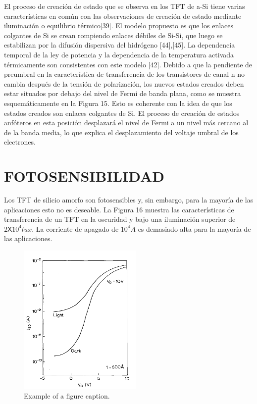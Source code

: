 \documentclass[conference]{IEEEtran}
\begin{document}
    El proceso de creación de estado que se observa en los TFT de a-Si tiene varias características 
    en común con las observaciones de creación de estado mediante iluminación o equilibrio térmico[39]. 
    El modelo propuesto es que los enlaces colgantes de Si se crean rompiendo enlaces débiles de 
    Si-Si, que luego se estabilizan por la difusión dispersiva del hidrógeno [44],[45]. La 
    dependencia temporal de la ley de potencia y la dependencia de la temperatura activada 
    térmicamente son consistentes con este modelo [42]. Debido a que la pendiente de preumbral en la 
    característica de transferencia de los transistores de canal n no cambia después de la tensión 
    de polarización, los nuevos estados creados deben estar situados por debajo del nivel de Fermi de 
    banda plana, como se muestra esquemáticamente en la Figura 15. Esto es coherente con la idea de 
    que los estados creados son enlaces colgantes de Si. El proceso de creación de estados anfóteros 
    en esta posición desplazará el nivel de Fermi a un nivel más cercano al de la banda media, lo que 
    explica el desplazamiento del voltaje umbral de los electrones.

\section{FOTOSENSIBILIDAD}

    Los TFT de silicio amorfo son fotosensibles y, sin embargo, para la mayoría de las aplicaciones 
    esto no es deseable. La Figura 16 muestra las características de transferencia de un TFT en 
    la oscuridad y bajo una iluminación superior de $2 \mathsf{X} 10^{4} lux$. La corriente de apagado de 
    $10^{4} A$ es demasiado alta para la mayoría de las aplicaciones.

\begin{figure}[htbp]
    \centerline{\includegraphics[width=6.0cm]{img/imagen-16.png}}
    \caption{Example of a figure caption.}%
    \label{fig16}
\end{figure} 
\end{document}
